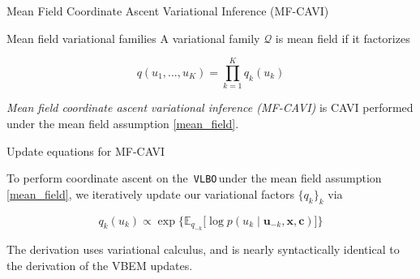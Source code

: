 \documentclass[10pt]{beamer}
\newcommand{\ds}{\displaystyle}
\newcommand{\+}[1]{\ensuremath{{\boldsymbol #1}}} %
\newcommand{\cond}{\; | \;}
\newcommand{\E}{\mathbb{E}}
\newcommand{\Q}{\mathcal{Q}}
\newcommand{\set}[1] { \{  {#1} \} }
\newcommand{\VLBO}{\,\texttt{VLBO}\,}
\begin{document}
\begin{frame}{Mean Field Coordinate Ascent Variational Inference (MF-CAVI)}

\begin{block}{Mean field variational families}
A variational family $\Q$ is mean field if it factorizes 

\begin{equation} \label{mean_field}
q(u_1, ..., u_K) = \ds\prod_{k=1}^K q_k(u_k)
\end{equation}
\end{block}

\textit{Mean field coordinate ascent variational inference (MF-CAVI)} is CAVI performed under the mean field assumption \eqref{mean_field}. 
   
\end{frame}

\begin{frame}{Update equations for MF-CAVI}

To perform coordinate ascent on the \VLBO under the mean field assumption \eqref{mean_field}, we iteratively update our variational factors $\set{q_k}_k$ via 
 
\begin{equation} \label{mfcavi_update}
q_k(u_k) \propto \exp \bigg\{ \E_{q_{-k}} \bigg[  \log p(u_k \cond \+u_{-k}, \+x, \+c)\bigg] \bigg\}
\end{equation}

The derivation uses variational calculus, and is nearly syntactically identical to the derivation of the VBEM updates. 




\end{frame}
\end{document}
